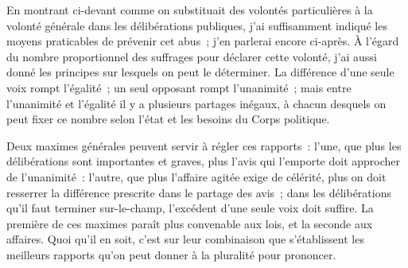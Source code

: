 \documentclass[french,twoside]{book} %
\begin{document}
En montrant ci-devant comme on substituait des volontés particulières à la volonté générale dans les délibérations publiques, j’ai suffisamment indiqué les moyens praticables de prévenir cet abus ; j’en parlerai encore ci-après. À l’égard du nombre proportionnel des suffrages pour déclarer cette volonté, j’ai aussi donné les principes sur lesquels on peut le déterminer. La différence d’une seule voix rompt l’égalité ; un seul opposant rompt l’unanimité ; mais entre l’unanimité et l’égalité il y a plusieurs partages inégaux, à chacun desquels on peut fixer ce nombre selon l’état et les besoins du Corps politique.\par
Deux maximes générales peuvent servir à régler ces rapports : l’une, que plus les délibérations sont importantes et graves, plus l’avis qui l’emporte doit approcher de l’unanimité : l’autre, que plus l’affaire agitée exige de célérité, plus on doit resserrer la différence prescrite dans le partage des avis ; dans les délibérations qu’il faut terminer sur-le-champ, l’excédent d’une seule voix doit suffire. La première de ces maximes paraît plus convenable aux lois, et la seconde aux affaires. Quoi qu’il en soit, c’est sur leur combinaison que s’établissent les meilleurs rapports qu’on peut donner à la pluralité pour prononcer.
\end{document}
